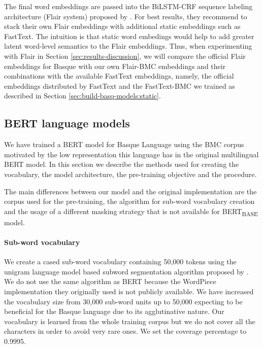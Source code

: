 \documentclass[10pt, a4paper]{article}
\begin{document}
The final word embeddings are passed into the BiLSTM-CRF sequence labeling architecture (Flair system) proposed by \cite{huang2015bidirectional}. For best results, they recommend to stack their own Flair embeddings with additional static embeddings such as FastText. The intuition is that static word embedings would help to add greater latent word-level semantics to the Flair embeddings. Thus, when experimenting with Flair in Section \ref{sec:results-discussion}, we will compare the official Flair embeddings for Basque with our own Flair-BMC embeddings and their combinations with the available FastText embeddings, namely, the official embeddings distributed by FastText and the FastText-BMC we trained as described in Section \ref{sec:build-basq-models:static}.

\subsection{BERT language models}\label{sec:build-basq-models:bert}

We have trained a BERT \cite{devlin2019bert} model for Basque Language using the BMC corpus motivated by the low representation this language has in the original multilingual BERT model. In this section we describe the methods used for creating the vocabulary, the model architecture, the pre-training objective and the procedure.

The main differences between our model and the original implementation are the corpus used for the pre-training, the algorithm for sub-word vocabulary creation and the usage of a different masking strategy that is not available for BERT\textsubscript{BASE} model. 

\paragraph{Sub-word vocabulary}

We create a cased sub-word vocabulary containing 50,000 tokens using the unigram language model based subword segmentation algorithm proposed by . We do not use the same algorithm as BERT because the WordPiece \cite{wu2016google} implementation they originally used is not publicly available. We have increased the vocabulary size from 30,000 sub-word units up to 50,000 expecting to be beneficial for the Basque language due to its agglutinative nature. Our vocabulary is learned from the whole training corpus but we do not cover all the characters in order to avoid very rare ones. We set the coverage percentage to 0.9995. 
\end{document}
